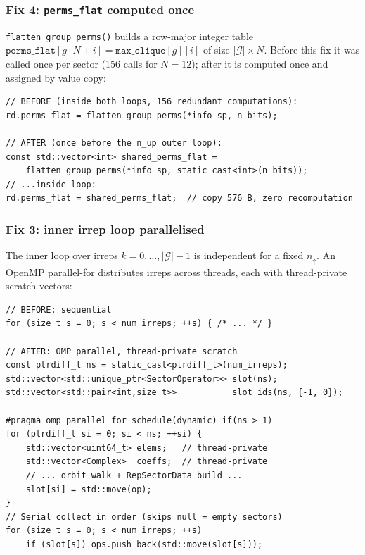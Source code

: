 \documentclass[11pt,a4paper]{article}
\begin{document}
\subsubsection{Fix 4: \texttt{perms\_flat} computed once}

\texttt{flatten\_group\_perms()} builds a row-major integer table
$\texttt{perms\_flat}[g \cdot N + i] = \texttt{max\_clique}[g][i]$
of size $|\mathcal{G}| \times N$.  Before this fix it was called once per
sector (156 calls for $N=12$); after it is computed once and assigned by
value copy:

\begin{lstlisting}[caption={Fix 4 -- shared \texttt{perms\_flat} (sector\_set.h)}]
// BEFORE (inside both loops, 156 redundant computations):
rd.perms_flat = flatten_group_perms(*info_sp, n_bits);

// AFTER (once before the n_up outer loop):
const std::vector<int> shared_perms_flat =
    flatten_group_perms(*info_sp, static_cast<int>(n_bits));
// ...inside loop:
rd.perms_flat = shared_perms_flat;  // copy 576 B, zero recomputation
\end{lstlisting}

\subsubsection{Fix 3: inner irrep loop parallelised}
\label{sec:fix3}

The inner loop over irreps $k = 0, \ldots, |\mathcal{G}|-1$ is independent
for a fixed $n_{\uparrow}$.  An OpenMP parallel-for distributes irreps across
threads, each with thread-private scratch vectors:

\begin{lstlisting}[caption={Fix 3 -- parallel irrep loop (sector\_set.h)}]
// BEFORE: sequential
for (size_t s = 0; s < num_irreps; ++s) { /* ... */ }

// AFTER: OMP parallel, thread-private scratch
const ptrdiff_t ns = static_cast<ptrdiff_t>(num_irreps);
std::vector<std::unique_ptr<SectorOperator>> slot(ns);
std::vector<std::pair<int,size_t>>           slot_ids(ns, {-1, 0});

#pragma omp parallel for schedule(dynamic) if(ns > 1)
for (ptrdiff_t si = 0; si < ns; ++si) {
    std::vector<uint64_t> elems;   // thread-private
    std::vector<Complex>  coeffs;  // thread-private
    // ... orbit walk + RepSectorData build ...
    slot[si] = std::move(op);
}
// Serial collect in order (skips null = empty sectors)
for (size_t s = 0; s < num_irreps; ++s)
    if (slot[s]) ops.push_back(std::move(slot[s]));
\end{lstlisting}
\end{document}
